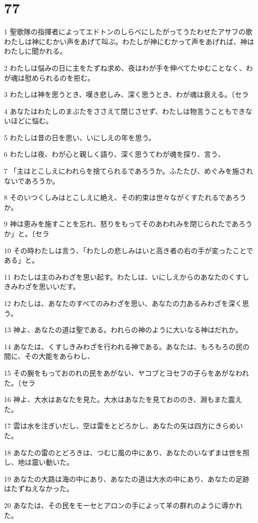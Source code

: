 \chapter{77}

\par 1 聖歌隊の指揮者によってエドトンのしらべにしたがってうたわせたアサフの歌 わたしは神にむかい声をあげて叫ぶ。わたしが神にむかって声をあげれば、神はわたしに聞かれる。
\par 2 わたしは悩みの日に主をたずね求め、夜はわが手を伸べてたゆむことなく、わが魂は慰められるのを拒む。
\par 3 わたしは神を思うとき、嘆き悲しみ、深く思うとき、わが魂は衰える。〔セラ
\par 4 あなたはわたしのまぶたをささえて閉じさせず、わたしは物言うこともできないほどに悩む。
\par 5 わたしは昔の日を思い、いにしえの年を思う。
\par 6 わたしは夜、わが心と親しく語り、深く思うてわが魂を探り、言う、
\par 7 「主はとこしえにわれらを捨てられるであろうか。ふたたび、めぐみを施されないであろうか。
\par 8 そのいつくしみはとこしえに絶え、その約束は世々ながくすたれるであろうか。
\par 9 神は恵みを施すことを忘れ、怒りをもってそのあわれみを閉じられたであろうか」と。〔セラ
\par 10 その時わたしは言う、「わたしの悲しみはいと高き者の右の手が変ったことである」と。
\par 11 わたしは主のみわざを思い起す。わたしは、いにしえからのあなたのくすしきみわざを思いいだす。
\par 12 わたしは、あなたのすべてのみわざを思い、あなたの力あるみわざを深く思う。
\par 13 神よ、あなたの道は聖である。われらの神のように大いなる神はだれか。
\par 14 あなたは、くすしきみわざを行われる神である。あなたは、もろもろの民の間に、その大能をあらわし、
\par 15 その腕をもっておのれの民をあがない、ヤコブとヨセフの子らをあがなわれた。〔セラ
\par 16 神よ、大水はあなたを見た。大水はあなたを見ておののき、淵もまた震えた。
\par 17 雲は水を注ぎいだし、空は雷をとどろかし、あなたの矢は四方にきらめいた。
\par 18 あなたの雷のとどろきは、つむじ風の中にあり、あなたのいなずまは世を照し、地は震い動いた。
\par 19 あなたの大路は海の中にあり、あなたの道は大水の中にあり、あなたの足跡はたずねえなかった。
\par 20 あなたは、その民をモーセとアロンの手によって羊の群れのように導かれた。

